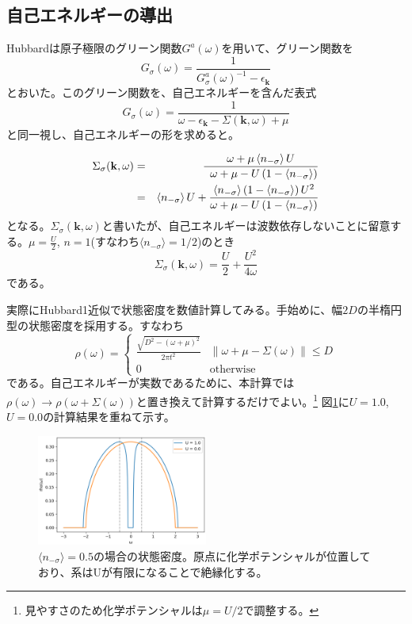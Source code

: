 \documentclass[12pt]{jarticle}
\begin{document}
\subsection{自己エネルギーの導出}
Hubbardは原子極限のグリーン関数$G^a(\omega)$を用いて、グリーン関数を
\begin{equation}
  G_{\sigma}(\omega) = \frac{1}{G_{\sigma}^a(\omega)^{-1} - \epsilon_{\bm{k}}}
\end{equation}
とおいた。このグリーン関数を、自己エネルギーを含んだ表式
\begin{equation}
  G_{\sigma}(\omega) = \frac{1}{\omega - \epsilon_{\bm{k}} - \Sigma(\bm{k}, \omega) + \mu}
\end{equation}
と同一視し、自己エネルギーの形を求めると。

\begin{eqnarray}
  \Sigma_{\sigma}(\mathbf{k},\omega)
&=& \frac{\omega+\mu \, \langle n_{-\sigma}\rangle \, U}{
\;\;\omega+\mu - U\,(1-\langle n_{-\sigma}\rangle)}\notag \\
&=& \langle n_{-\sigma}\rangle\,U
+ \frac{\langle n_{-\sigma}\rangle\,(1-\langle n_{-\sigma}\rangle)\,U^2}
       {\omega+\mu - U\,(1-\langle n_{-\sigma}\rangle)}
\end{eqnarray}
となる。$\Sigma_{\sigma}(\mathbf{k},\omega)$と書いたが、自己エネルギーは波数依存しないことに留意する。$\mu = \frac{U}{2}$, $n=1$(すなわち$\langle n_{-\sigma}\rangle = 1/2$)のとき
\begin{equation}
  \Sigma_{\sigma}(\mathbf{k},\omega) = \frac{U}{2}+\frac{U^2}{4\omega}
\end{equation}
である。

実際にHubbard1近似で状態密度を数値計算してみる。手始めに、幅$2D$の半楕円型の状態密度を採用する。すなわち
\begin{equation}
  \rho(\omega) = 
  \begin{cases}
    \frac{\sqrt{D^2 - (\omega + \mu)^2}}{2\pi t^2} & \| \omega + \mu - \Sigma(\omega) \| \leq D \\
    0 & \text{otherwise}
  \end{cases}
\end{equation}
である。自己エネルギーが実数であるために、本計算では$\rho(\omega) \rightarrow \rho(\omega + \Sigma(\omega))$と置き換えて計算するだけでよい。\footnote[1]{
  見やすさのため化学ポテンシャルは$\mu = U/2$で調整する。
}
図\ref{fig:hubbard1-dos}に$U = 1.0$, $U = 0.0$の計算結果を重ねて示す。
\begin{figure}[h]\label{fig:hubbard1-dos}
  \centering
  \includegraphics[width=0.5\textwidth]{dos_hubbard1.eps}
  \caption{$\langle n_{-\sigma} \rangle = 0.5$の場合の状態密度。原点に化学ポテンシャルが位置しており、系はUが有限になることで絶縁化する。}
\end{figure}
\end{document}
